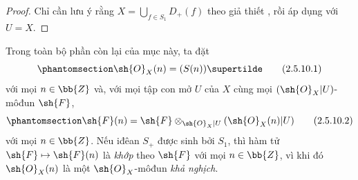 \documentclass[oneside,10pt]{amsart}
\makeatletter
\newcommand{\ega@arrow}[2]{\mathchoice{#1}{#2}{#2}{#2}}
\let\ega@shortmapsto\mapsto
\renewcommand{\mapsto}{\ega@arrow{\longmapsto}{\ega@shortmapsto}}
\let\EGAOriginalLabel\label
\renewcommand{\label}[1]{\phantomsection\EGAOriginalLabel{#1}}
\makeatother
\begin{document}
\begin{proof}
Chỉ cần lưu ý rằng $X=\bigcup_{f\in S_1}D_+(f)$ theo giả thiết , rồi áp dụng  với $U=X$.
\end{proof}

\begin{env}[2.5.10]
\label{II.2.5.10}
Trong toàn bộ phần còn lại của mục này, ta đặt
\[
\label{II.2.5.10.1}
  \sh{O}_X(n)=(S(n))\supertilde
\tag{2.5.10.1}
\]
với mọi $n\in\bb{Z}$ và, với mọi tập con mở $U$ của $X$ cùng mọi $(\sh{O}_X|U)$-môđun $\sh{F}$,
\[
\label{II.2.5.10.2}
  \sh{F}(n)=\sh{F}\otimes_{\sh{O}_X|U}(\sh{O}_X(n)|U)
\tag{2.5.10.2}
\]
với mọi $n\in\bb{Z}$.
Nếu iđêan $S_+$ được sinh bởi $S_1$, thì hàm tử $\sh{F}\mapsto\sh{F}(n)$ là \emph{khớp} theo $\sh{F}$ với mọi $n\in\bb{Z}$, vì khi đó $\sh{O}_X(n)$ là một $\sh{O}_X$-môđun \emph{khả nghịch}.
\end{env}
\end{document}
